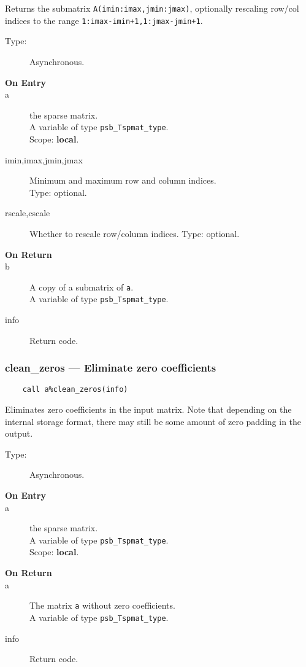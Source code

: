 Returns the submatrix \verb|A(imin:imax,jmin:jmax)|, optionally
rescaling row/col indices to the range
\verb|1:imax-imin+1,1:jmax-jmin+1|.  
\begin{description}
\item[Type:] Asynchronous.
\item[\bf On Entry]
\item[a] the sparse matrix.\\
A variable of type \verb|psb_Tspmat_type|.\\
Scope: {\bf local}.\\
\item[imin,imax,jmin,jmax] Minimum and maximum row and column indices.\\
Type: optional.
\item[rscale,cscale] Whether to rescale row/column indices.
Type: optional.
\end{description}
\begin{description}
\item[\bf On Return]
\item[b] A copy  of a submatrix of \verb|a|.\\
A variable of type \verb|psb_Tspmat_type|.
\item[info] Return code. 
\end{description}

\subsubsection{clean\_zeros --- Eliminate zero coefficients}
\begin{verbatim}
    call a%clean_zeros(info)
\end{verbatim}

Eliminates zero coefficients in the input matrix. Note that depending
on the internal storage format, there may still be some amount of
zero padding in the output.

\begin{description}
\item[Type:] Asynchronous.
\item[\bf On Entry]
\item[a] the sparse matrix.\\
A variable of type \verb|psb_Tspmat_type|.\\
Scope: {\bf local}.\\
\end{description}
\begin{description}
\item[\bf On Return]
\item[a] The matrix  \verb|a| without zero coefficients.\\
A variable of type \verb|psb_Tspmat_type|.
\item[info] Return code. 
\end{description}

